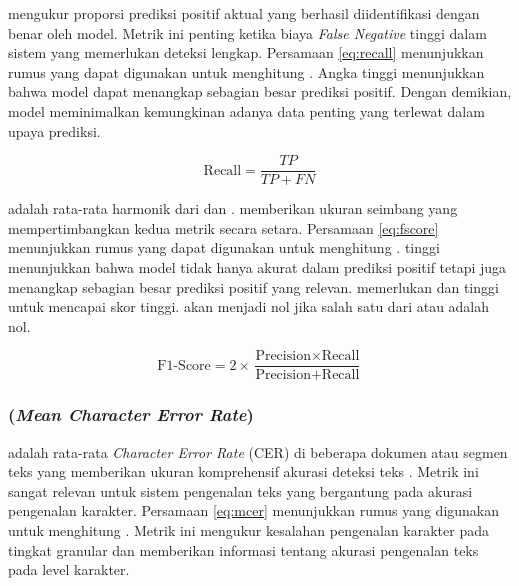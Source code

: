 \recallfl{} mengukur proporsi prediksi positif aktual yang berhasil diidentifikasi dengan benar oleh model. Metrik ini penting ketika biaya \emph{False Negative} tinggi dalam sistem yang memerlukan deteksi lengkap. Persamaan \eqref{eq:recall} menunjukkan rumus yang dapat digunakan untuk menghitung \recall{} \parencite{jayaswal2020evalmetrics}. Angka \recall{} tinggi menunjukkan bahwa model dapat menangkap sebagian besar prediksi positif. Dengan demikian, model meminimalkan kemungkinan adanya data penting yang terlewat dalam upaya prediksi.

\begin{equation}
    \label{eq:recall}
\text{Recall} = \frac{TP}{TP + FN}
\end{equation}

\fscore{} adalah rata-rata harmonik dari \precision{} dan \recall{}. \fscore{} memberikan ukuran seimbang yang mempertimbangkan kedua metrik secara setara. Persamaan \eqref{eq:fscore} menunjukkan rumus yang dapat digunakan untuk menghitung \fscore{} \parencite{jayaswal2020evalmetrics}. \fscore{} tinggi menunjukkan bahwa model tidak hanya akurat dalam prediksi positif tetapi juga menangkap sebagian besar prediksi positif yang relevan. \fscore{} memerlukan \precision{} dan \recall{} tinggi untuk mencapai skor tinggi. \fscore{} akan menjadi nol jika salah satu dari \precision{} atau \recall{} adalah nol.

\begin{equation}
    \label{eq:fscore}
\text{F1-Score} = 2 \times \frac{\text{Precision} \times \text{Recall}}{\text{Precision} + \text{Recall}}
\end{equation}

% 

\subsubsection{\mcer{} (\emph{Mean Character Error Rate})}

\mcer{} adalah rata-rata \emph{Character Error Rate} (CER) di beberapa dokumen atau segmen teks yang memberikan ukuran komprehensif akurasi deteksi teks \parencite{neudecker2021survey}. Metrik ini sangat relevan untuk sistem pengenalan teks yang bergantung pada akurasi pengenalan karakter. Persamaan \eqref{eq:mcer} menunjukkan rumus yang digunakan untuk menghitung \mcer{}. Metrik ini mengukur kesalahan pengenalan karakter pada tingkat granular dan memberikan informasi tentang akurasi pengenalan teks pada level karakter.

